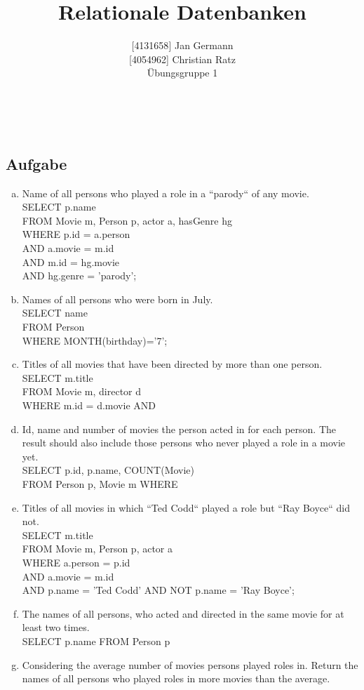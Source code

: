 \documentclass[11pt,a4paper,DIV=9]{scrartcl}
\author{{[}4131658{]} Jan Germann \\{[}4054962{]} Christian Ratz\\Übungsgruppe 1}
\title{Relationale Datenbanken}
\newcounter{temp}
\newcommand{\aufgabe}[1]{
  \setcounter{temp}{\value{subsection}}
  \setcounter{subsection}{#1}
  \addtocounter{subsection}{-1}
  \subsection{Aufgabe}
  \setcounter{subsection}{\value{temp}}
}
\renewcommand{\author}[1]{\renewcommand{\author}{#1}}
\renewcommand{\title}[1]{\renewcommand{\title}{#1}}
\newcommand{\makehomeworktitle}{
  \begin{minipage}[t]{6.5cm}
    \sf{\author}
  \end{minipage}
  \begin{minipage}[t]{6.5cm}
    \begin{flushright}
      \sf{\title\\\today}
    \end{flushright}
  \end{minipage}
  \\[0.2cm]
  \begin{center}
    \sf{
      \color{blue}{
        \LARGE{Aufgabenblatt \blattnr}
      }
    }
  \end{center}
  \vspace{0.1cm}
}
\begin{document}
\makehomeworktitle
\aufgabe{1}
  \begin{enumerate}[a.]
    	\item Name of all persons who played a role in a ``parody`` of any movie.\hfill\\
	SELECT p.name \\
	FROM Movie m, Person p, actor a, hasGenre hg \\
	WHERE p.id = a.person \\
	AND a.movie = m.id \\
	AND m.id = hg.movie \\
 	AND hg.genre = 'parody';

       	\item Names of all persons who were born in July.\hfill\\
	SELECT name \\
	FROM Person \\
	WHERE MONTH(birthday)='7';
	
           \item Titles of all movies that have been directed by more than one person.\hfill\\ %
           SELECT m.title \\
           FROM Movie m, director d \\
           WHERE m.id = d.movie
           AND 

           \item Id, name and number of movies the person acted in for each person. The result should also include those persons who never played a role in a movie yet.\hfill\\ %
           SELECT p.id, p.name, COUNT(Movie) \\
           FROM Person p, Movie m
           WHERE

           \item Titles of all movies in which ``Ted Codd`` played a role but ``Ray Boyce`` did not.\hfill\\
           SELECT m.title \\
           FROM Movie m, Person p, actor a \\ 
           WHERE a.person = p.id \\
           AND a.movie = m.id \\
           AND p.name = 'Ted Codd'
           AND NOT p.name = 'Ray Boyce';

           \item The names of all persons, who acted and directed in the same movie for at least two times.\hfill\\ %
           SELECT p.name
           FROM Person p
           
           \item Considering the average number of movies persons played roles in. Return the names of all persons who played roles in more movies than the average.\hfill\\ %

    \end{enumerate}
\end{document}
